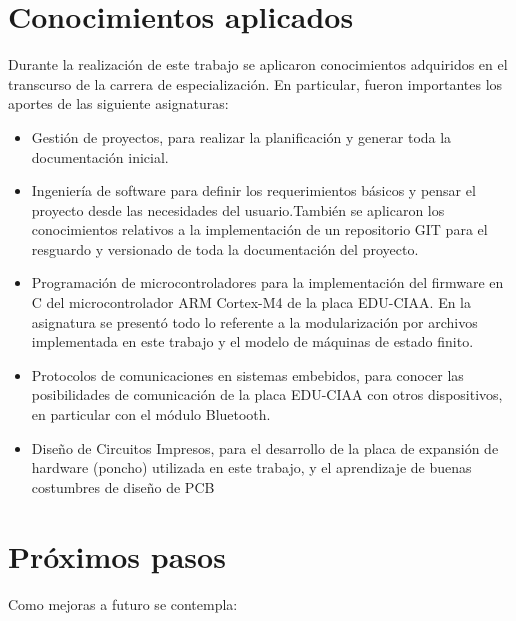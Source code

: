 \section{Conocimientos aplicados}

Durante la realización de este trabajo se aplicaron conocimientos adquiridos en el transcurso de la carrera de especialización. 
En particular, fueron importantes los aportes de las siguiente  asignaturas:


\begin{itemize}
	\item Gestión de proyectos, para realizar la planificación y generar toda la documentación inicial.
	\item Ingeniería de software para definir los requerimientos básicos y pensar el proyecto desde las necesidades del usuario.También se aplicaron los conocimientos relativos a la implementación de un repositorio GIT para el resguardo y versionado de toda la documentación del proyecto.
	\item Programación de microcontroladores para la implementación del firmware en C del microcontrolador ARM Cortex-M4 de la placa EDU-CIAA. En la asignatura se presentó todo lo referente a la modularización por archivos implementada en este trabajo y el modelo de máquinas de estado finito.
	\item Protocolos de comunicaciones en sistemas embebidos, para conocer las posibilidades de comunicación de la placa EDU-CIAA con otros dispositivos, en particular con el módulo Bluetooth. 
	\item Diseño de Circuitos Impresos, para el desarrollo de la placa de expansión de hardware (poncho) utilizada en este trabajo, y el aprendizaje de buenas costumbres de diseño de PCB
			
\end{itemize}

\section{Próximos pasos}

Como mejoras a futuro se contempla:

